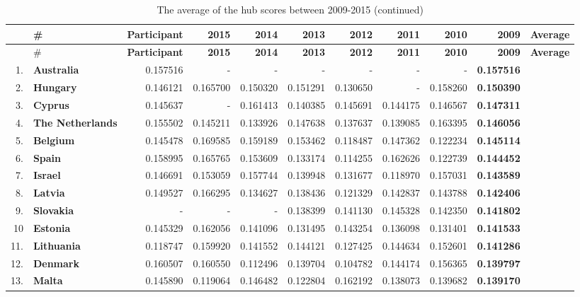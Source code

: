 \documentclass[a4paper,11pt]{report}
\begin{document}
\begin{landscape}
\begin{longtable}{r l | r | r | r | r | r | r | r | r}


\caption{The average of the hub scores between 2009-2015}
&\#&\textbf{Participant}&\textbf{2015}&\textbf{2014}&\textbf{2013}&\textbf{2012}&\textbf{2011}&\textbf{2010}&\textbf{2009}&\textbf{Average}\\
\hline \hline
\endfirsthead
 

\caption{The average of the hub scores between 2009-2015 (continued)}
&\#&\textbf{Participant}&\textbf{2015}&\textbf{2014}&\textbf{2013}&\textbf{2012}&\textbf{2011}&\textbf{2010}&\textbf{2009}&\textbf{Average}\\
\hline \hline

\endhead


1.&\textbf{Australia}&0.157516&-&-&-&-&-&-&\textbf{0.157516}\\
2.&\textbf{Hungary}&0.146121&0.165700&0.150320&0.151291&0.130650&-&0.158260&\textbf{0.150390}\\
3.&\textbf{Cyprus}&0.145637&-&0.161413&0.140385&0.145691&0.144175&0.146567&\textbf{0.147311}\\
4.&\textbf{The Netherlands}&0.155502&0.145211&0.133926&0.147638&0.137637&0.139085&0.163395&\textbf{0.146056}\\
5.&\textbf{Belgium}&0.145478&0.169585&0.159189&0.153462&0.118487&0.147362&0.122234&\textbf{0.145114}\\
6.&\textbf{Spain}&0.158995&0.165765&0.153609&0.133174&0.114255&0.162626&0.122739&\textbf{0.144452}\\
7.&\textbf{Israel}&0.146691&0.153059&0.157744&0.139948&0.131677&0.118970&0.157031&\textbf{0.143589}\\
8.&\textbf{Latvia}&0.149527&0.166295&0.134627&0.138436&0.121329&0.142837&0.143788&\textbf{0.142406}\\
9.&\textbf{Slovakia}&-&-&-&0.138399&0.141130&0.145328&0.142350&\textbf{0.141802}\\
10&\textbf{Estonia}&0.145329&0.162056&0.141096&0.131495&0.143254&0.136098&0.131401&\textbf{0.141533}\\
11.&\textbf{Lithuania}&0.118747&0.159920&0.141552&0.144121&0.127425&0.144634&0.152601&\textbf{0.141286}\\
12.&\textbf{Denmark}&0.160507&0.160550&0.112496&0.139704&0.104782&0.144174&0.156365&\textbf{0.139797}\\
13.&\textbf{Malta}&0.145890&0.119064&0.146482&0.122804&0.162192&0.138073&0.139682&\textbf{0.139170}\\

\end{longtable}
\end{landscape}
\end{document}
